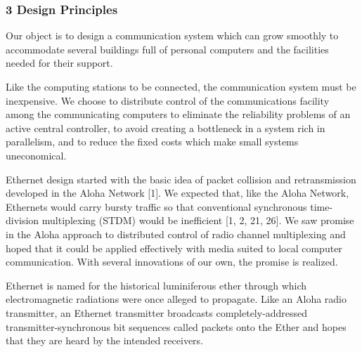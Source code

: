 \subsubsection*{3 Design Principles}

Our object is to design a communication system which can grow smoothly to accommodate several buildings full of personal computers and the facilities needed for their support.

Like the computing stations to be connected, the communication system must be inexpensive. We choose to distribute control of the communications facility among the communicating computers to eliminate the reliability problems of an active central controller, to avoid creating a bottleneck in a system rich in parallelism, and to reduce the fixed costs which make small systems uneconomical.

Ethernet design started with the basic idea of packet collision and retransmission developed in the Aloha Network [1]. We expected that, like the Aloha Network, Ethernets would carry bursty traffic so that conventional synchronous time-division multiplexing (STDM) would be inefficient [1, 2, 21, 26]. We saw promise in the Aloha approach to distributed control of radio channel multiplexing and hoped that it could be applied effectively with media suited to local computer communication. With several innovations of our own, the promise is realized.



Ethernet is named for the historical luminiferous ether through which electromagnetic radiations were once alleged to propagate. Like an Aloha radio transmitter, an Ethernet transmitter broadcasts completely-addressed transmitter-synchronous bit sequences called packets onto the Ether and hopes that they are heard by the intended receivers. 
%

